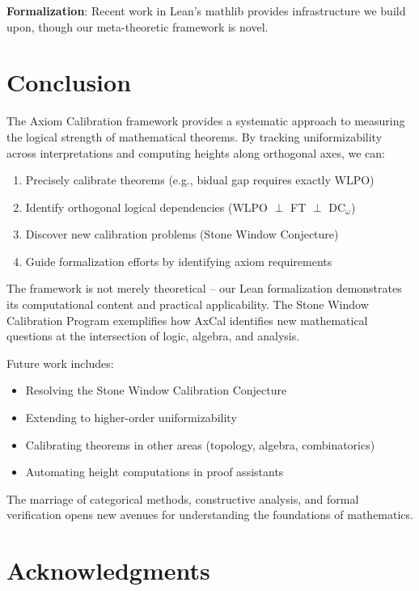 \documentclass[11pt]{article}
\begin{document}
\textbf{Formalization}: Recent work in Lean's mathlib \cite{mathlib} provides infrastructure we build upon, though our meta-theoretic framework is novel.

\section{Conclusion}

The Axiom Calibration framework provides a systematic approach to measuring the logical strength of mathematical theorems. By tracking uniformizability across interpretations and computing heights along orthogonal axes, we can:

\begin{enumerate}
\item Precisely calibrate theorems (e.g., bidual gap requires exactly WLPO)
\item Identify orthogonal logical dependencies (WLPO $\perp$ FT $\perp$ DC$_\omega$)
\item Discover new calibration problems (Stone Window Conjecture)
\item Guide formalization efforts by identifying axiom requirements
\end{enumerate}

The framework is not merely theoretical -- our Lean formalization demonstrates its computational content and practical applicability. The Stone Window Calibration Program exemplifies how AxCal identifies new mathematical questions at the intersection of logic, algebra, and analysis.

Future work includes:
\begin{itemize}
\item Resolving the Stone Window Calibration Conjecture
\item Extending to higher-order uniformizability
\item Calibrating theorems in other areas (topology, algebra, combinatorics)
\item Automating height computations in proof assistants
\end{itemize}

The marriage of categorical methods, constructive analysis, and formal verification opens new avenues for understanding the foundations of mathematics.

\section*{Acknowledgments}
\end{document}
